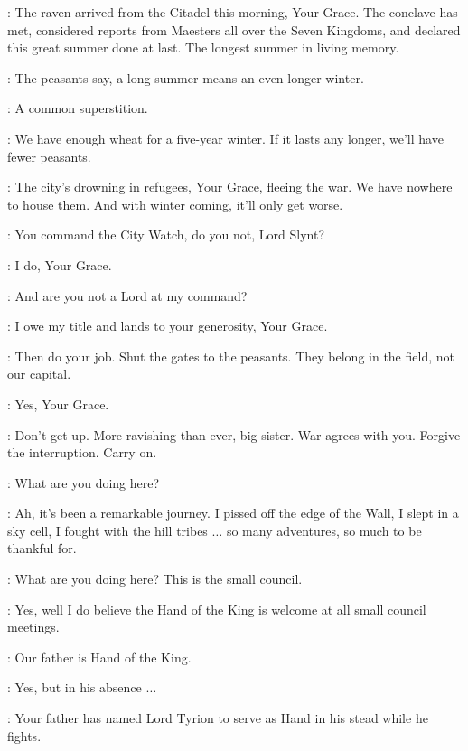 
\PYCELLE: The raven arrived from the Citadel this morning, Your Grace. The conclave has met, considered reports from Maesters all over the Seven Kingdoms, and declared this great summer done at last. The longest summer in living memory.

\VARYS: The peasants say, a long summer means an even longer winter.

\PYCELLE: A common superstition.

\LITTLEFINGER: We have enough wheat for a five-year winter. If it lasts any longer, we'll have fewer peasants.

\JANOSSLYNT: The city's drowning in refugees, Your Grace, fleeing the war. We have nowhere to house them. And with winter coming, it'll only get worse.

\CERSEI: You command the City Watch, do you not, Lord Slynt?

\JANOSSLYNT: I do, Your Grace.

\CERSEI: And are you not a Lord at my command?

\JANOSSLYNT: I owe my title and lands to your generosity, Your Grace.

\CERSEI: Then do your job. Shut the gates to the peasants. They belong in the field, not our capital.

\JANOSSLYNT: Yes, Your Grace.


\TYRION: Don't get up. More ravishing than ever, big sister. War agrees with you. Forgive the interruption. Carry on.

\CERSEI: What are you doing here?

\TYRION: Ah, it's been a remarkable journey. I pissed off the edge of the Wall, I slept in a sky cell, I fought with the hill tribes $\ldots$ so many adventures, so much to be thankful for.

\CERSEI: What are you doing here? This is the small council.

\TYRION: Yes, well I do believe the Hand of the King is welcome at all small council meetings.

\CERSEI: Our father is Hand of the King.

\TYRION: Yes, but in his absence $\ldots$ 

\VARYS: Your father has named Lord Tyrion to serve as Hand in his stead while he fights.

